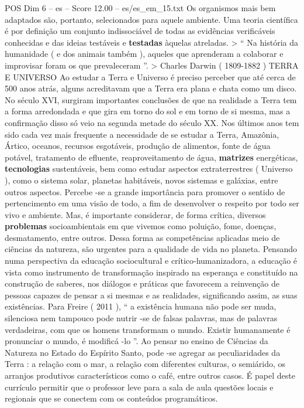 \begin{textsample}{POS Dim 6 – es – Score 12.00 – es/es\_em\_15.txt}
Os organismos mais bem adaptados são, portanto, selecionados para aquele ambiente.
Uma teoria científica é por definição um conjunto indissociável de todas as evidências verificáveis conhecidas e das ideias testáveis e \textbf{testadas} àquelas atreladas. > “ Na história da humanidade ( e dos animais também ), aqueles que aprenderam a colaborar e improvisar foram os que prevaleceram ”. > Charles Darwin ( 1809-1882 ) TERRA E UNIVERSO Ao estudar a Terra e Universo é preciso perceber que até cerca de 500 anos atrás, alguns acreditavam que a Terra era plana e chata como um disco.
No século XVI, surgiram importantes conclusões de que na realidade a Terra tem a forma arredondada e que gira em torno do sol e em torno de si mesma, mas a confirmação disso só veio na segunda metade do século XX.
Nos últimos anos tem sido cada vez mais frequente a necessidade de se estudar a Terra, Amazônia, Ártico, oceanos, recursos esgotáveis, produção de alimentos, fonte de água potável, tratamento de efluente, reaproveitamento de água, \textbf{matrizes} energéticas, \textbf{tecnologias} sustentáveis, bem como estudar aspectos extraterrestres ( Universo ), como o sistema solar, planetas habitáveis, novos sistemas e galáxias, entre outros aspectos.
Percebe -se a grande importância para promover o sentido de pertencimento em uma visão de todo, a fim de desenvolver o respeito por todo ser vivo e ambiente.
Mas, é importante considerar, de forma crítica, diversos \textbf{problemas} socioambientais em que vivemos como poluição, fome, doenças, desmatamento, entre outros.
Dessa forma as competências aplicadas meio de ciências da natureza, são urgentes para a qualidade de vida no planeta.
Pensando numa perspectiva da educação sociocultural e crítico-humanizadora, a educação é vista como instrumento de transformação inspirado na esperança e constituído na construção de saberes, nos diálogos e práticas que favorecem a reinvenção de pessoas capazes de pensar a si mesmas e as realidades, significando assim, as suas existências.
Para Freire ( 2011 ), “ a existência humana não pode ser muda, silenciosa nem tampouco pode nutrir -se de falsas palavras, mas de palavras verdadeiras, com que os homens transformam o mundo.
Existir humanamente é pronunciar o mundo, é modificá -lo ”.
Ao pensar no ensino de Ciências da Natureza no Estado do Espírito Santo, pode -se agregar as peculiaridades da Terra : a relação com o mar, a relação com diferentes culturas, o semiárido, os arranjos produtivos característicos como o café, entre outros casos.
É papel deste currículo permitir que o professor leve para a sala de aula questões locais e regionais que se conectem com os conteúdos programáticos.

\end{textsample}
